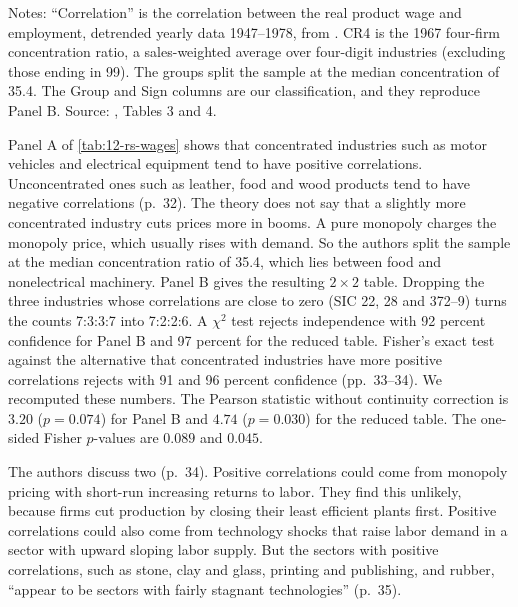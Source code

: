 \begin{table}[htbp]
\smallskip
\begin{minipage}{0.9\textwidth}
\footnotesize
Notes: ``Correlation'' is the correlation between the real product wage and employment, detrended yearly data
1947--1978, from \citet{Burda1984}. CR4 is the 1967 four-firm concentration ratio, a sales-weighted average over
four-digit industries (excluding those ending in 99). The groups split the sample at the median concentration of 35.4.
The Group and Sign columns are our classification, and they reproduce Panel B. Source: \citet{RotembergSaloner1984},
Tables 3 and 4.
\end{minipage}
\end{table}

Panel A of \cref{tab:12-rs-wages} shows that concentrated industries such as motor vehicles and electrical equipment
tend to have positive correlations. Unconcentrated ones such as leather, food and wood products tend to have negative
correlations (p.~32). The theory does not say that a slightly more concentrated industry cuts prices more in
booms. A pure monopoly charges the monopoly price, which usually rises with demand. So the authors split the sample at
the median concentration ratio of 35.4, which lies between food and nonelectrical machinery. Panel B gives the
resulting $2 \times 2$ table. Dropping the three industries whose correlations are close to zero (SIC 22, 28 and
372--9) turns the counts 7:3:3:7 into 7:2:2:6. A $\chi^2$ test rejects independence with 92 percent confidence for
Panel B and 97 percent for the reduced table. Fisher's exact test against the alternative that concentrated industries
have more positive correlations rejects with 91 and 96 percent confidence (pp.~33--34). We recomputed these numbers.
The Pearson statistic without continuity correction is $3.20$ ($p = 0.074$) for Panel B and $4.74$ ($p = 0.030$) for the
reduced table. The one-sided Fisher $p$-values are $0.089$ and $0.045$.

The authors discuss two (p.~34). Positive correlations could come from monopoly pricing with short-run increasing
returns to labor. They find this unlikely, because firms cut production by closing their least efficient plants
first. Positive correlations could also come from technology shocks that raise labor demand in a sector with upward
sloping labor supply. But the sectors with positive correlations, such as stone, clay and glass, printing and
publishing, and rubber, ``appear to be sectors with fairly stagnant technologies'' (p.~35).

